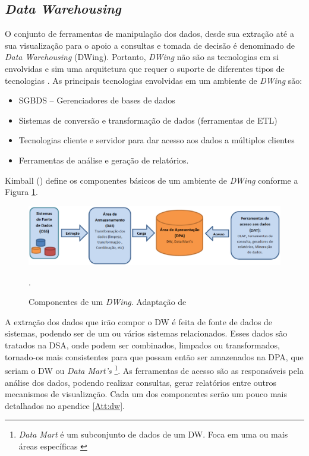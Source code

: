 \subsection{\emph{Data Warehousing}}

O conjunto de ferramentas de manipulação dos dados, desde sua extração até a sua visualização para o apoio a consultas e tomada de decisão é denominado de \emph{Data Warehousing} (DWing). Portanto,  \emph{DWing} não são as tecnologias em si envolvidas e sim uma arquitetura que requer o suporte de diferentes tipos de tecnologias \cite{inmon2002}.  As principais tecnologias envolvidas em um ambiente de \emph{DWing} são:


\begin{itemize}
\item SGBDS – Gerenciadores de bases de dados
\item Sistemas de conversão e transformação de dados (ferramentas de ETL)
\item Tecnologias cliente e servidor para dar acesso aos dados a múltiplos clientes
\item Ferramentas de análise e geração de relatórios.
\end{itemize}

Kimball (\citeyear{kimball2002}) define os componentes básicos de um ambiente de \emph{DWing} conforme a Figura \ref{componentesdw}.

 \begin{figure}[!htb]
 	\centering
 		\includegraphics[scale=0.5]{figuras/componentesDW}
 		\caption{Componentes de um \emph{DWing}. Adaptação de \cite{kimball2002}}.
 		\label{componentesdw}
 \end{figure}


 A extração dos dados que irão compor o DW é feita de fonte de dados de sistemas, podendo ser de um ou vários sistemas relacionados. Esses dados são tratados na DSA, onde podem ser combinados, limpados ou transformados, tornado-os mais consistentes para que possam então ser amazenados na DPA, que seriam o DW ou \emph{Data Mart's}
 \footnote{\emph{Data Mart} é um subconjunto de dados de um DW. Foca em uma ou mais áreas específicas \cite{kimball2002}}. 
 As ferramentas de acesso são as responsáveis pela análise dos dados, podendo realizar consultas, gerar relatórios entre outros mecanismos de visualização. Cada um dos componentes serão um pouco mais detalhados no apendice \ref{Att:dw}.

